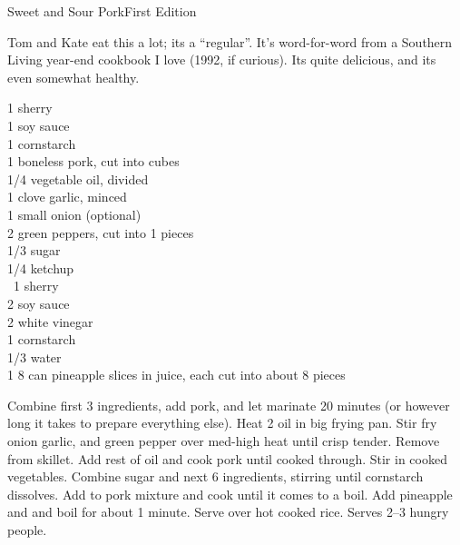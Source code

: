 \begin{entry}{Sweet and Sour Pork}{First Edition}

\begin{open}
  Tom and Kate eat this a lot; its a ``regular''. It's word-for-word from a
  Southern Living year-end cookbook I love (1992, if curious). Its quite
  delicious, and its even somewhat healthy.
\end{open}
\begin{ingredients}
  \SI{1}{\tblspoon} sherry\\
  \SI{1}{\tblspoon} soy sauce\\
  \SI{1}{\tblspoon} cornstarch\\
  \SI{1}{\pound} boneless pork, cut into cubes\\
  \SI{1/4}{\cup} vegetable oil, divided\\
  1 clove garlic, minced\\
  1 small onion (optional)\\
  2 green peppers, cut into \SI{1}{\inch} pieces\\
  \SI{1/3}{\cup} sugar\\
  \SI{1/4}{\cup} ketchup\\\
  \SI{1}{\tblspoon} sherry\\
  \SI{2}{\tblspoon} soy sauce\\
  \SI{2}{\tblspoon} white vinegar\\
  \SI{1}{\tblspoon} cornstarch\\
  \SI{1/3}{\cup} water\\
  1 \SI{8}{\ounce} can pineapple slices in juice, each cut into about 8 pieces
\end{ingredients}
%
%
Combine first 3 ingredients, add pork, and let marinate 20 minutes (or however
long it takes to prepare everything else). Heat \SI{2}{\tblspoon} oil in big
frying pan.  Stir fry onion garlic, and green pepper over med-high heat until
crisp tender.  Remove from skillet. Add rest of oil and cook pork until cooked
through.  Stir in cooked vegetables. Combine sugar and next 6 ingredients,
stirring until cornstarch dissolves. Add to pork mixture and cook until it
comes to a boil. Add pineapple and and boil for about 1 minute. Serve over hot
cooked rice. Serves \numrange{2}{3} hungry people.
\end{entry}